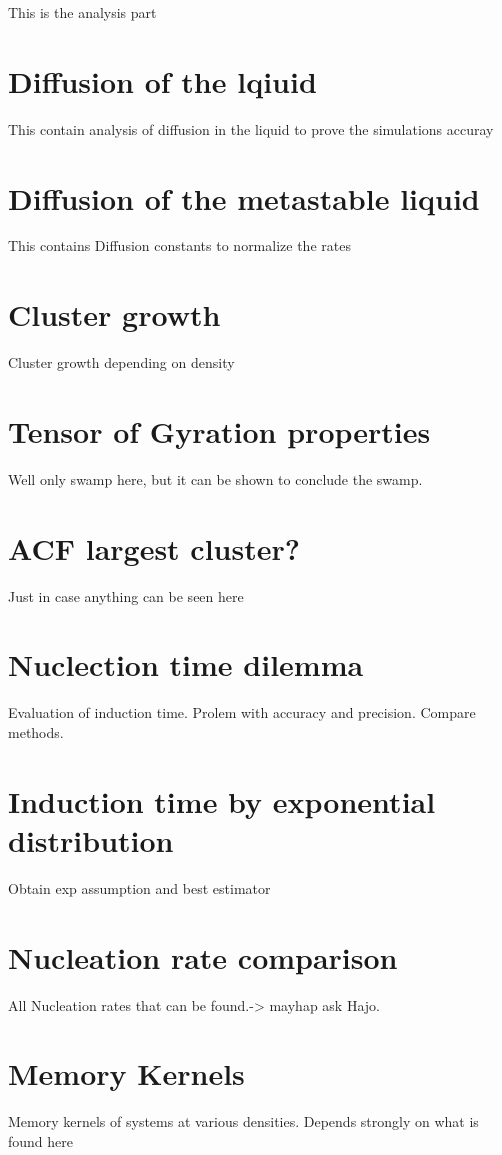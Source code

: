 
\label{chp:data_analysis}
This is the analysis part

\section{Diffusion of the lqiuid}
\label{sec:diffusion_liquid}
This contain analysis of diffusion in the liquid to prove the simulations accuray

\section{Diffusion of the metastable liquid}
\label{sec:diffusion_metastable_liquid}
This contains Diffusion constants to normalize the rates

\section{Cluster growth}
\label{sec:Cluster growth}
Cluster growth depending on density

\section{Tensor of Gyration properties}
\label{sec:tog}
Well only swamp here, but it can be shown to conclude the swamp.

\section{ACF largest cluster?}
\label{sec:acf}
Just in case anything can be seen here

\section{Nuclection time dilemma}
\label{sec:nucleation_times}
Evaluation of induction time. Prolem with accuracy and precision. Compare methods.

\section{Induction time by exponential distribution}
\label{sec:induction_times}
Obtain exp assumption and best estimator

\section{Nucleation rate comparison}
\label{sec:nucleation_rates}
All Nucleation rates that can be found.-> mayhap ask Hajo.

\section{Memory Kernels}
\label{sec:memory_kernels}
Memory kernels of systems at various densities. Depends strongly on what is found here


